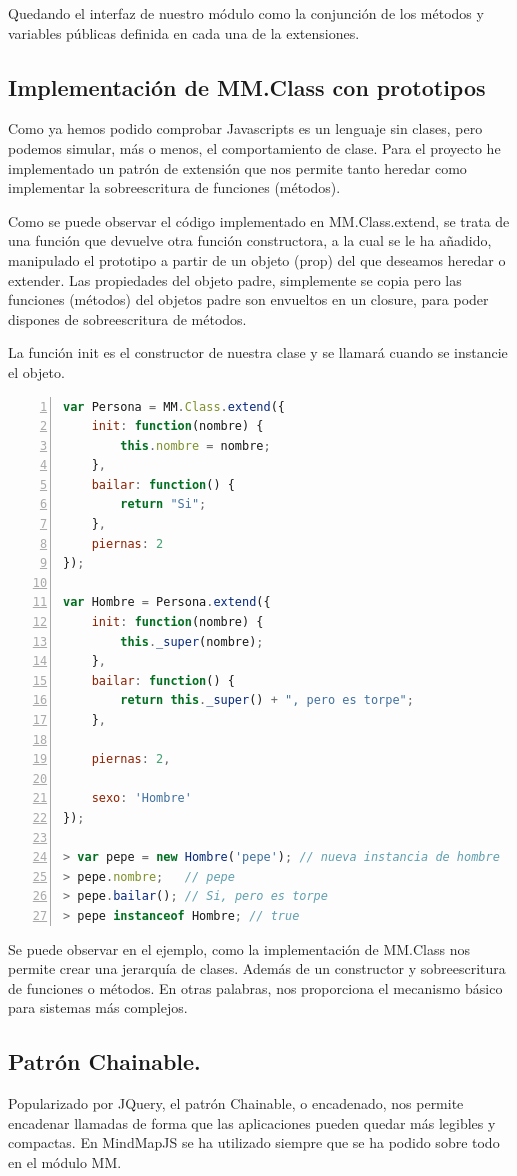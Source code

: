 Quedando el interfaz de nuestro módulo como la conjunción de los métodos y variables públicas definida en cada una de la extensiones.


\subsection{Implementación de MM.Class con prototipos}
Como ya hemos podido comprobar Javascripts es un lenguaje sin clases, pero podemos simular, más o menos, el comportamiento de clase. Para el proyecto he implementado un patrón de extensión que nos permite tanto heredar como implementar la sobreescritura de funciones (métodos). 




Como se puede observar el código implementado en MM.Class.extend, se trata de una función que devuelve otra función constructora, a la cual se le ha añadido, manipulado el prototipo a partir de un objeto (prop) del que deseamos heredar o extender. Las propiedades del objeto padre, simplemente se copia pero las funciones (métodos) del objetos padre son envueltos en un closure, para poder dispones de sobreescritura de métodos. 

La función init es el constructor de nuestra clase y se llamará cuando se instancie el objeto.

\begin{lstlisting}[language=JavaScript, numbers=left]
var Persona = MM.Class.extend({
	init: function(nombre) {
		this.nombre = nombre;
	},
	bailar: function() {
		return "Si";
	},
	piernas: 2
});

var Hombre = Persona.extend({
	init: function(nombre) {
		this._super(nombre);
	},
	bailar: function() {
		return this._super() + ", pero es torpe";
	},
	
	piernas: 2,
	
	sexo: 'Hombre'
});

> var pepe = new Hombre('pepe'); // nueva instancia de hombre
> pepe.nombre;   // pepe
> pepe.bailar(); // Si, pero es torpe
> pepe instanceof Hombre; // true
\end{lstlisting}

Se puede observar en el ejemplo, como la implementación de MM.Class nos permite crear una jerarquía de clases. Además de un constructor y sobreescritura de funciones o métodos. En otras palabras, nos proporciona el mecanismo básico para sistemas más complejos. 


\subsection{Patrón Chainable.}
Popularizado por JQuery, el patrón Chainable, o encadenado, nos permite encadenar llamadas de forma que las aplicaciones pueden quedar más legibles y compactas. En MindMapJS se ha utilizado siempre que se ha podido sobre todo en el módulo MM. 

